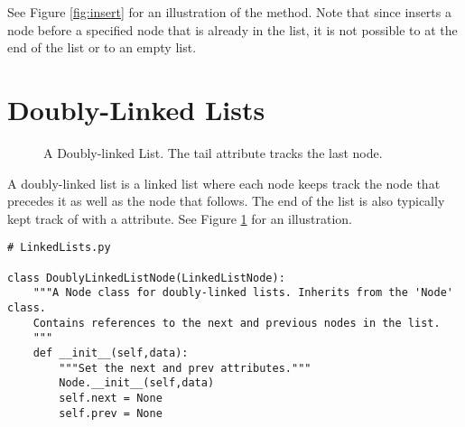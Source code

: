 \begin{figure>}
\begin{problem}
See Figure \ref{fig:insert} for an illustration of the  method.
Note that since  inserts a node before a specified node that is already in the list, it is not possible to  at the end of the list or to an empty list.
\end{problem}

\section*{Doubly-Linked Lists}

\begin{figure}
\centering
{}
\caption{A Doubly-linked List. The tail attribute tracks the last node.}
\label{fig:doublyLinked}
\end{figure}

A doubly-linked list is a linked list where each node keeps track the node that precedes it as well as the node that follows.
The end of the list is also typically kept track of with a  attribute.
See Figure \ref{fig:doublyLinked} for an illustration.


\begin{lstlisting}
# LinkedLists.py

class DoublyLinkedListNode(LinkedListNode):
	"""A Node class for doubly-linked lists. Inherits from the 'Node' class.
	Contains references to the next and previous nodes in the list.
	"""
	def __init__(self,data):
		"""Set the next and prev attributes."""
		Node.__init__(self,data)
		self.next = None
		self.prev = None
\end{lstlisting}


\end{figure>}

